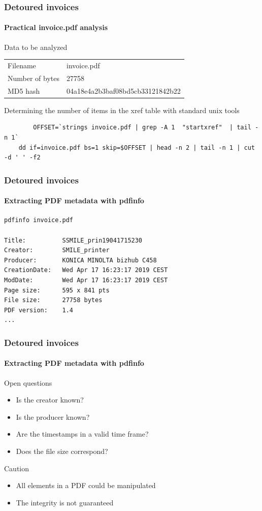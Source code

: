 \begin{frame}[fragile]
    \frametitle{Detoured invoices}
    \framesubtitle{Practical invoice.pdf analysis}
    \begin{block}{Data to be analyzed}
        \begin{tabular}{ll}
            Filename &   invoice.pdf\\
            Number of bytes & 27758\\
            MD5 hash &  04a18e4a2b3baf08bd5cb33121842b22
        \end{tabular}
    \end{block}

    \begin{block}{Determining the number of items in the xref table with standard unix tools}
        \begin{lstlisting}
        OFFSET=`strings invoice.pdf | grep -A 1  "startxref"  | tail -n 1`
    dd if=invoice.pdf bs=1 skip=$OFFSET | head -n 2 | tail -n 1 | cut -d ' ' -f2
    \end{lstlisting}
\end{block}
\end{frame}



\begin{frame}[fragile]
    \frametitle{Detoured invoices}
    \framesubtitle{Extracting PDF metadata with pdfinfo}
\small
    \begin{lstlisting}
pdfinfo invoice.pdf

Title:          SSMILE_prin19041715230
Creator:        SMILE_printer
Producer:       KONICA MINOLTA bizhub C458
CreationDate:   Wed Apr 17 16:23:17 2019 CEST
ModDate:        Wed Apr 17 16:23:17 2019 CEST
Page size:      595 x 841 pts
File size:      27758 bytes
PDF version:    1.4
...
    \end{lstlisting}
\end{frame}

\begin{frame}[fragile]
    \frametitle{Detoured invoices}
    \framesubtitle{Extracting PDF metadata with pdfinfo}
    \begin{block}{Open questions}
        \begin{itemize}
            \item Is the creator known?
            \item Is the producer known?
            \item Are the timestamps in a valid time frame?
            \item Does the file size correspond?
        \end{itemize}
    \end{block}

    \begin{block}{Caution}
        \begin{itemize}
            \item All elements in a PDF could be manipulated
            \item The integrity is not guaranteed
        \end{itemize}
    \end{block}
\end{frame}

